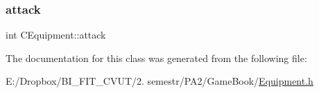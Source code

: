 \mbox{\label{class_c_equipment_a84182e68749a37eb8eb9ec97cded148b}} 
\subsubsection{\texorpdfstring{attack}{attack}}
{\footnotesize\ttfamily int C\+Equipment\+::attack\hspace{0.3cm}{\ttfamily [protected]}}



The documentation for this class was generated from the following file\+:\begin{DoxyCompactItemize}
\item 
E\+:/\+Dropbox/\+B\+I\+\_\+\+F\+I\+T\+\_\+\+C\+V\+U\+T/2. semestr/\+P\+A2/\+Game\+Book/\mbox{\hyperlink{_equipment_8h}{Equipment.\+h}}\end{DoxyCompactItemize}
